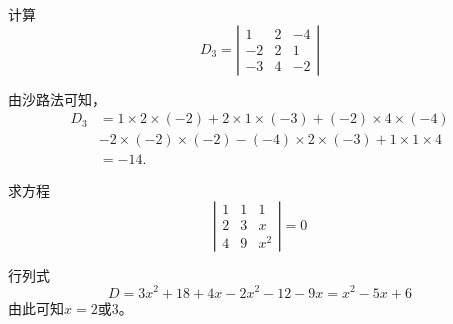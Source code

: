 \begin{frame}
\begin{li}
  计算
  $$
  D_3 = 
  \left |
    \begin{array}{rrr}
      1  & 2 & -4 \\ 
      -2 & 2 & 1  \\
      -3 & 4 & -2
    \end{array}
  \right|
  $$
\end{li} \pause 

\begin{jie}
  由沙路法可知，
  $$
  \begin{array}{ll}
    D_3 &=   1\times   2  \times (-2) +   2  \times 1 \times (-3) + (-2) \times 4 \times (-4)\\[0.2cm]
        & - 2\times (-2) \times (-2) - (-4) \times 2 \times (-3) +   1  \times 1 \times   4\\[0.2cm]
        & = -14.
  \end{array}
  $$
\end{jie}
\end{frame}

\begin{frame}
\begin{li}
  求方程
  $$
  \left |
    \begin{array}{ccc}
      1  & 1 & 1 \\
      2  & 3 & x  \\
      4  & 9 & x^2
    \end{array}
  \right| = 0
  $$        
\end{li} \pause 
\begin{jie}
  行列式
  $$ 
  D = 3x^2 + 18 + 4x - 2x^2 - 12 - 9x 
  = x^2 - 5x + 6
  $$
  由此可知$x=2$或$3$。
\end{jie}
%
\end{frame}

